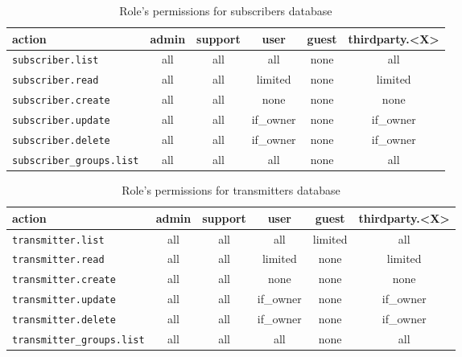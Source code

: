\begin{table}[htbp]
\label{tab:protocoldef:permissionmatrix:subscribersdb}
  \begin{tabular}{|l|c|c|c|c|c|} \hline
    action                        & admin & support & user      & guest & thirdparty.<X> \\ \hline \hline
    \verb|subscriber.list|        & all   & all     & all       & none  & all            \\ \hline
    \verb|subscriber.read|        & all   & all     & limited   & none  & limited        \\ \hline
    \verb|subscriber.create|      & all   & all     & none      & none  & none           \\ \hline
    \verb|subscriber.update|      & all   & all     & if\_owner & none  & if\_owner      \\ \hline
    \verb|subscriber.delete|      & all   & all     & if\_owner & none  & if\_owner      \\ \hline
    \verb|subscriber_groups.list| & all   & all     & all       & none  & all            \\ \hline
  \end{tabular}
  \caption{Role's permissions for subscribers database}
\end{table}



\begin{table}[htbp]
\label{tab:protocoldef:permissionmatrix:transmittersdb}
  \begin{tabular}{|l|c|c|c|c|c|} \hline
    action                         & admin & support & user      & guest    & thirdparty.<X> \\ \hline \hline
    \verb|transmitter.list|        & all   & all     & all       & limited  & all       \\ \hline
    \verb|transmitter.read|        & all   & all     & limited   & none     & limited   \\ \hline
    \verb|transmitter.create|      & all   & all     & none      & none     & none      \\ \hline
    \verb|transmitter.update|      & all   & all     & if\_owner & none     & if\_owner \\ \hline
    \verb|transmitter.delete|      & all   & all     & if\_owner & none     & if\_owner \\ \hline \hline
    \verb|transmitter_groups.list| & all   & all     & all       & none     & all       \\ \hline
  \end{tabular}
  \caption{Role's permissions for transmitters database}
\end{table}



